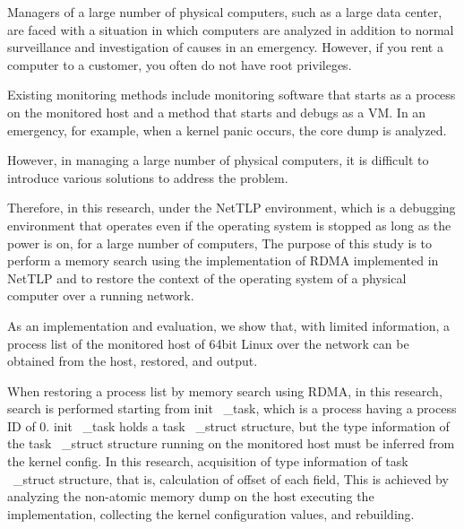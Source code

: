 \begin{eabstract}

Managers of a large number of physical computers, such as a large data center, are faced with a situation in which computers are analyzed in addition to normal surveillance and investigation of causes in an emergency.
However, if you rent a computer to a customer, you often do not have root privileges.

Existing monitoring methods include monitoring software that starts as a process on the monitored host and a method that starts and debugs as a VM.
In an emergency, for example, when a kernel panic occurs, the core dump is analyzed.

However, in managing a large number of physical computers, it is difficult to introduce various solutions to address the problem.

Therefore, in this research, under the NetTLP environment, which is a debugging environment that operates even if the operating system is stopped as long as the power is on, for a large number of computers,
The purpose of this study is to perform a memory search using the implementation of RDMA implemented in NetTLP and to restore the context of the operating system of a physical computer over a running network.

As an implementation and evaluation, we show that, with limited information, a process list of the monitored host of 64bit Linux over the network can be obtained from the host, restored, and output.

When restoring a process list by memory search using RDMA, in this research, search is performed starting from init \ _task, which is a process having a process ID of 0.
init \ _task holds a task \ _struct structure, but the type information of the task \ _struct structure running on the monitored host must be inferred from the kernel config.
In this research, acquisition of type information of task \ _struct structure, that is, calculation of offset of each field,
This is achieved by analyzing the non-atomic memory dump on the host executing the implementation, collecting the kernel configuration values, and rebuilding.

\end{eabstract}
